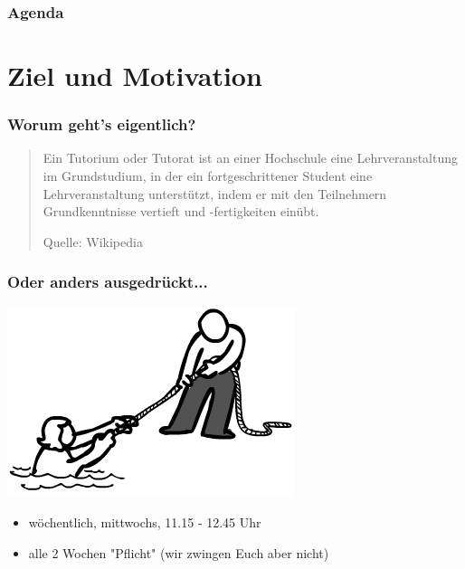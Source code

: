 \documentclass[12pt]{beamer}
\begin{document}
\begin{frame}
	\frametitle{Agenda}
	\tableofcontents
\end{frame}


\section{Ziel und Motivation}

\begin{frame}

\frametitle{Worum geht's eigentlich?}

	\begin{quote}
		Ein Tutorium oder Tutorat ist an einer Hochschule eine Lehrveranstaltung
		im Grundstudium, in der ein fortgeschrittener Student eine
		Lehrveranstaltung unterstützt, indem er mit den Teilnehmern
		Grundkenntnisse vertieft und -fertigkeiten einübt.

		\begin{flushright}
			\scriptsize Quelle: Wikipedia
		\end{flushright}

	\end{quote}
	
\end{frame}

\begin{frame}

	\frametitle{Oder anders ausgedrückt...}

	\pause
	\begin{center}
		\includegraphics[scale=0.42]{src/img/help}
	\end{center}
	\pause

	\begin{itemize}
		\item wöchentlich, mittwochs, 11.15 - 12.45 Uhr
		\item alle 2 Wochen "Pflicht" (wir zwingen Euch aber nicht)
	\end{itemize}

\end{frame}
\end{document}
